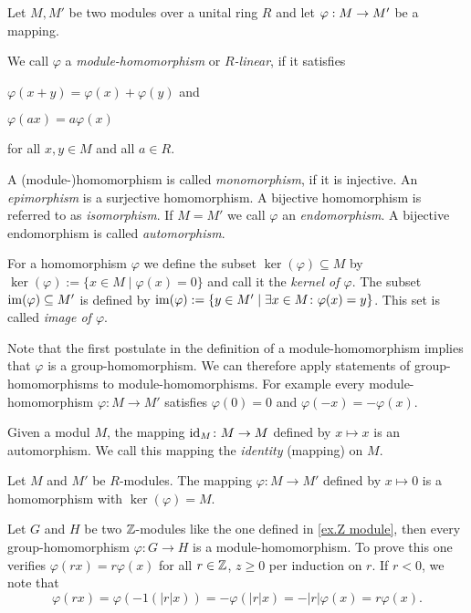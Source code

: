  \begin{defin}
Let $M,M'$ be two modules over a unital ring $R$ and let $\varphi : M \rightarrow M'$ be a mapping. 
\begin{thmlist}
\item We call $\varphi$ a \emph{module-homomorphism} or \textit{$R$-linear}, if it satisfies
\begin{exlist}
\item $\varphi(x+y)=\varphi(x)+\varphi(y)$ and
\item $\varphi(ax)=a\varphi(x)$
\end{exlist}
for all $x,y \in M$ and all $a \in R$.
\item A (module-)homomorphism is called \textit{monomorphism}, if it is injective. An \emph{epimorphism} is a surjective homomorphism. A bijective homomorphism is referred to as \textit{isomorphism}. If $M=M'$ we call $\varphi$ an \textit{endomorphism}. A bijective endomorphism is called \textit{automorphism}.
\item For a homomorphism $\varphi$ we define the subset $\ker(\varphi)\subseteq M$ by $\ker(\varphi):=\lbrace x\in M \mid \varphi(x)=0\rbrace$ and call it the \emph{kernel of $\varphi$}. The subset $\operatorname{im}(\varphi)\subseteq M'$ is defined by $\operatorname{im}(\varphi):=\lbrace y\in M' \mid \exists x\in M\colon \varphi(x)=y\rbrace$. This set is called \emph{image of $\varphi$}.
\end{thmlist}
\end{defin}

Note that the first postulate in the definition of a module-homomorphism implies that $\varphi$ is a group-homomorphism. We can therefore apply statements of group-homomorphisms to mod\-ule-ho\-mo\-morph\-isms. For example every module-homomorphism $\varphi\colon M\rightarrow M'$ satisfies $\varphi(0)=0$ and $\varphi(-x)=-\varphi(x)$.

\begin{exam}
\begin{exlist}
\item Given a modul $M$, the mapping $\operatorname{id}_M\colon M \rightarrow M$ defined by $x\mapsto x$ is an automorphism. We  call this mapping the \emph{identity} (mapping) on $M$.
\item Let $M$ and $M'$ be $R$-modules. The mapping $\varphi\colon M\rightarrow M'$ defined by $x\mapsto 0$ is a homomorphism with $\ker(\varphi)=M$. 
\item Let $G$ and $H$ be two $\operatorname{\mathbb{Z}}$-modules like the one defined in \cref{ex.Z module}, then every group-homomorphism $\varphi\colon G\rightarrow H$ is a module-homomorphism. To prove this one verifies $\varphi(rx)=r\varphi(x)$ for all $r\in\operatorname{\mathbb{Z}}$, $z\geq 0$ per induction on $r$. If $r<0$, we note that 
\begin{equation*}
\varphi(rx)=\varphi(-1(\lvert r\rvert x))=-\varphi(\lvert r\rvert x)=-\lvert r\rvert\varphi(x)=r\varphi(x).
\end{equation*}
\end{exlist}
\end{exam}

